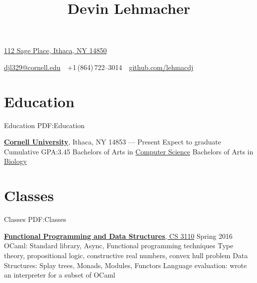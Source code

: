 \documentclass[letterpaper,10pt,oneside]{simpleresumecv}
\newcommand{\CVAuthor}{Devin Lehmacher}
\newcommand{\CVWebpage}{github.com/lehmacdj}
\begin{document}
\begin{minipage}[t][0pt]{\linewidth}
\pagestyle{empty}

\title{\CVAuthor}

\begin{subtitle}
\href{https://www.google.com/maps/place/112+Sage+Pl+Room-B09,+Ithaca,+NY+14850}
{112 Sage Place, Ithaca, NY 14850}
\par
\href{mailto:djl329@cornell.edu}
{djl329@cornell.edu}
\,\SubBulletSymbol\,
+1\,(864)\,722--3014
\,\SubBulletSymbol\,
\href{https://\CVWebpage}
{\CVWebpage}
\end{subtitle}

\begin{body}

\section%
{Education}
{Education}
{PDF:Education}

\href{https://www.cornell.edu}
{\textbf{Cornell University}},
Ithaca, NY 14853
\hfill
{} --- Present
\BulletItem%
Expect to graduate 
\BulletItem%
Cumulative GPA:\@ 3.45
\BulletItem%
Bachelors of Arts in
\href{https://www.cs.cornell.edu}{Computer Science}
\BulletItem%
Bachelors of Arts in
\href{https://www.biology.cornell.edu}{Biology}

\section%
{Classes}
{Classes}
{PDF:Classes}

\href{https://www.cs.cornell.edu/courses/cs3110/2016sp/}
{\textbf{Functional Programming and Data Structures}, CS 3110}
\hfill Spring 2016
\BulletItem%
OCaml: Standard library, Async, Functional programming techniques
\BulletItem%
Type theory, propositional logic, constructive real numbers, convex hull problem
\BulletItem%
Data Structures: Splay trees, Monads, Modules, Functors
\BulletItem%
Language evaluation: wrote an interpreter for a subset of OCaml


\end{body}
\end{minipage}
\end{document}
